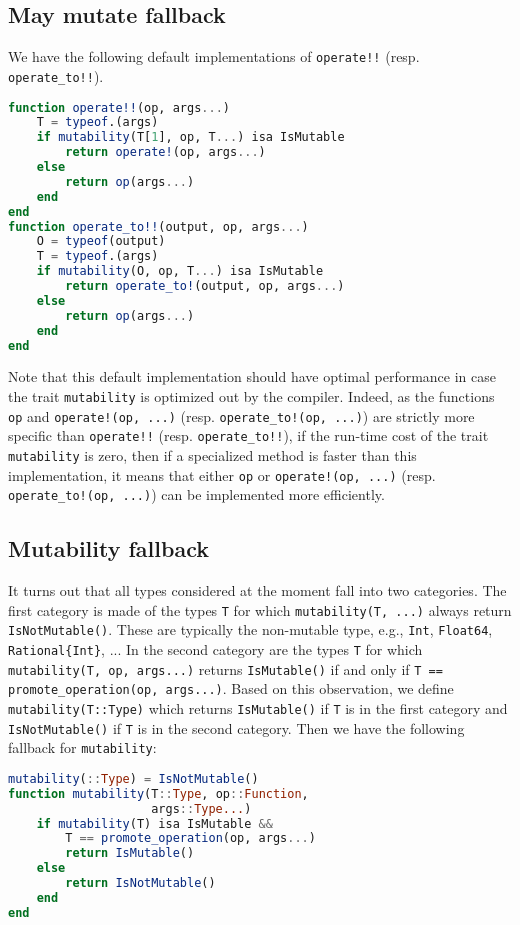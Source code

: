 \documentclass{juliacon}
\begin{document}
\subsection{May mutate fallback}
We have the following default implementations of \lstinline|operate!!| (resp. \lstinline|operate_to!!|).
\begin{lstlisting}[language = Julia]
function operate!!(op, args...)
    T = typeof.(args)
    if mutability(T[1], op, T...) isa IsMutable
        return operate!(op, args...)
    else
        return op(args...)
    end
end
function operate_to!!(output, op, args...)
    O = typeof(output)
    T = typeof.(args)
    if mutability(O, op, T...) isa IsMutable
        return operate_to!(output, op, args...)
    else
        return op(args...)
    end
end
\end{lstlisting}
Note that this default implementation should have optimal performance in case the trait \lstinline|mutability| is optimized out by the compiler.
Indeed, as the functions \lstinline|op| and \lstinline|operate!(op, ...)| (resp. \lstinline|operate_to!(op, ...)|) are strictly more specific than \lstinline|operate!!| (resp. \lstinline|operate_to!!|),
if the run-time cost of the trait \lstinline|mutability| is zero,
then if a specialized method is faster than this implementation,
it means that either
\lstinline|op| or \lstinline|operate!(op, ...)| (resp. \lstinline|operate_to!(op, ...)|)
can be implemented more efficiently.

\subsection{Mutability fallback}
It turns out that all types considered at the moment fall into two categories.
The first category is made of the types \lstinline|T| for which
\lstinline|mutability(T, ...)| always return \lstinline|IsNotMutable()|.
These are typically the non-mutable type, e.g., \lstinline|Int|, \lstinline|Float64|, \lstinline|Rational{Int}|, ...
In the second category are the types \lstinline|T| for which
\lstinline|mutability(T, op, args...)| returns \lstinline|IsMutable()|
if and only if \lstinline|T == promote_operation(op, args...)|.
Based on this observation, we define \lstinline|mutability(T::Type)| which
returns \lstinline|IsMutable()| if \lstinline|T| is in the first category
and \lstinline|IsNotMutable()| if \lstinline|T| is in the second category.
Then we have the following fallback for \lstinline|mutability|:
\begin{lstlisting}[language = Julia]
mutability(::Type) = IsNotMutable()
function mutability(T::Type, op::Function,
                    args::Type...)
    if mutability(T) isa IsMutable &&
        T == promote_operation(op, args...)
        return IsMutable()
    else
        return IsNotMutable()
    end
end
\end{lstlisting}
\end{document}
